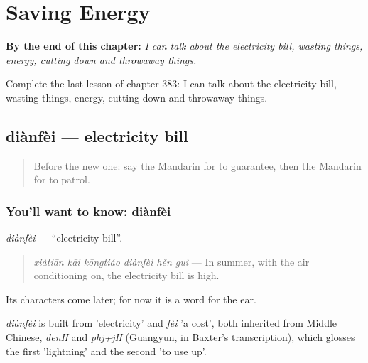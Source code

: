 
\chapter{Saving Energy}
\label{ch:zh-saving-energy}

\begin{chapteropening}
\textbf{By the end of this chapter:} \emph{I can talk about the electricity bill, wasting things, energy, cutting down and throwaway things.}

Complete the last lesson of chapter 383: I can talk about the electricity bill, wasting things, energy, cutting down and throwaway things.
\end{chapteropening}

\section[diànfèi]{diànfèi — electricity bill}

\label{lesson:ZH-C383-dianfei}



\begin{quote}
Before the new one: say the Mandarin for to guarantee, then the Mandarin for to patrol.
\end{quote}

\subsection*{You'll want to know: diànfèi}
\emph{diànfèi} — \textquotedblleft{}electricity bill\textquotedblright{}.

\begin{quote}
\emph{xiàtiān kāi kōngtiáo diànfèi hěn guì} — In summer, with the air conditioning on, the electricity bill is high.
\end{quote}

Its characters come later; for now it is a word for the ear.

\begin{cousinweb}
\emph{diànfèi} is built from  'electricity' and \emph{fèi} 'a cost', both inherited from Middle Chinese, \emph{denH} and \emph{phj+jH} (Guangyun, in Baxter's transcription), which glosses the first 'lightning' and the second 'to use up'.
\end{cousinweb}

